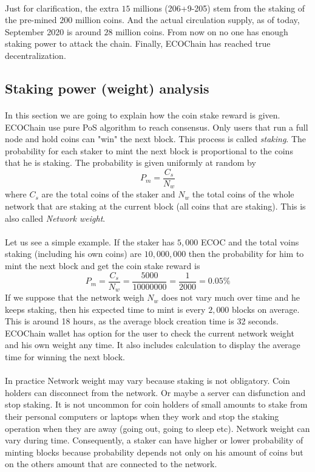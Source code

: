 \documentclass{article}
\begin{document}
\paragraph{}
Just for clarification, the extra $15$ millions (206+9-205) stem from the staking of the pre-mined $200$ million coins. And the actual circulation supply, as of today, September 2020 is around $28$ million coins. From now on no one has enough staking power to attack the chain. Finally, ECOChain has reached true decentralization.
 
\subsection{Staking power (weight) analysis}
\paragraph{}
In this section we are going to explain how the coin stake reward is given. ECOChain use pure PoS algorithm to reach consensus. Only users that run a full node and hold coins can "win" the next block. This process is called \emph{staking}. The probability for each staker to mint the next block is proportional to the coins that he is staking. The probability is given uniformly at random by
$$P_{m} = \frac{C_{s}}{N_{w}}$$
where $C_{s}$ are the total coins of the staker and $N_{w}$ the total coins of the whole network that are staking at the current block (all coins that are staking). This is also called \emph{Network weight}.
\paragraph{}
Let us see a simple example. If the staker has $5,000$ ECOC and the total voins staking (including his own coins) are $10,000,000$ then the probability for him to mint the next block and get the coin stake reward is 
$$P_{m} = \frac{C_{s}}{N_{w}}=\frac{5000}{10000000}=\frac{1}{2000}=0.05\%$$
If we suppose that the network weigh $N_{w}$ does not vary much over time and he keeps staking, then his expected time to mint is every $2,000$ blocks on average. This is around 18 hours, as the average block creation time is 32 seconds. ECOChain wallet has option for the user to check the current network weight and his own weight any time. It also includes calculation to display the average time for winning the next block.
\paragraph{}
In practice Network weight may vary because staking is not obligatory. Coin holders can disconnect from the network. Or maybe a server can disfunction and stop staking. It is not uncommon for coin holders of small amounts to stake from their personal computers or laptops when they work and stop the staking operation when they are away (going out, going to sleep etc). Network weight can vary during time. Consequently, a staker can have higher or lower probability of minting blocks because probability depends not only on his amount of coins but on the others amount that are connected to the network.
\end{document}
